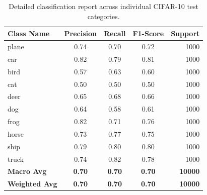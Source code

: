 \documentclass[11pt]{article}
\begin{document}
\begin{table}[H]
\centering
\small
\begin{tabular}{|l|c|c|c|r|}
\hline
\textbf{Class Name} & \textbf{Precision} & \textbf{Recall} & \textbf{F1-Score} & \textbf{Support} \\ \hline
plane  & 0.74 & 0.70 & 0.72 & 1000 \\ \hline
car    & 0.82 & 0.79 & 0.81 & 1000 \\ \hline
bird   & 0.57 & 0.63 & 0.60 & 1000 \\ \hline
cat    & 0.50 & 0.50 & 0.50 & 1000 \\ \hline
deer   & 0.65 & 0.68 & 0.66 & 1000 \\ \hline
dog    & 0.64 & 0.58 & 0.61 & 1000 \\ \hline
frog   & 0.82 & 0.71 & 0.76 & 1000 \\ \hline
horse  & 0.73 & 0.77 & 0.75 & 1000 \\ \hline
ship   & 0.79 & 0.80 & 0.80 & 1000 \\ \hline
truck  & 0.74 & 0.82 & 0.78 & 1000 \\ \hline \hline
\textbf{Macro Avg} & \textbf{0.70} & \textbf{0.70} & \textbf{0.70} & \textbf{10000} \\ \hline
\textbf{Weighted Avg} & \textbf{0.70} & \textbf{0.70} & \textbf{0.70} & \textbf{10000} \\ \hline
\end{tabular}
\caption{Detailed classification report across individual CIFAR-10 test categories.}
\label{tab:class_report}
\end{table}

\end{document}
